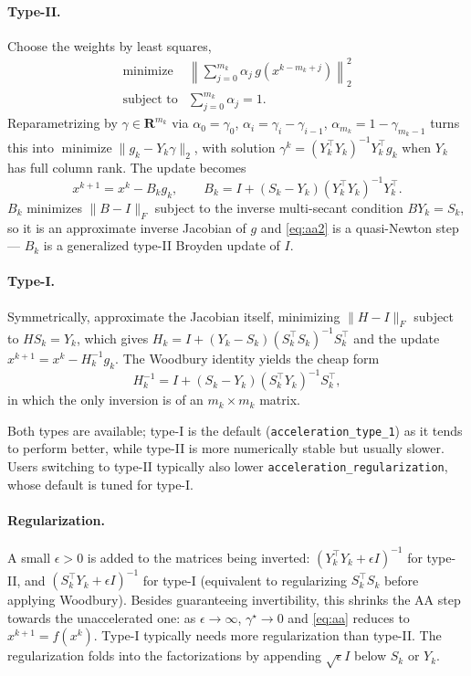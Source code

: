 \documentclass[11pt,a4paper]{article}
\newcommand{\R}{\mathbf{R}}
\newcommand{\tr}{^\top}
\DeclareMathOperator*{\minimize}{minimize}
\theoremstyle{plain}
\begin{document}
\paragraph{Type-II.} Choose the weights by least squares,
\[
\begin{array}{ll}
\minimize & \left\|\sum_{j=0}^{m_k} \alpha_j\, g(x^{k-m_k+j})\right\|_2^2\\[0.4em]
\mbox{subject to} & \sum_{j=0}^{m_k} \alpha_j = 1 .
\end{array}
\]
Reparametrizing by
$\gamma \in \R^{m_k}$ via $\alpha_0 = \gamma_0$,
$\alpha_i = \gamma_i - \gamma_{i-1}$, $\alpha_{m_k} = 1 - \gamma_{m_k-1}$ turns
this into $\minimize \|g_k - Y_k\gamma\|_2$, with solution
$\gamma^k = (Y_k\tr Y_k)^{-1}Y_k\tr g_k$ when $Y_k$ has full column rank. The
update becomes
\begin{equation}\label{eq:aa2}
x^{k+1} = x^k - B_k g_k, \qquad
B_k = I + (S_k - Y_k)(Y_k\tr Y_k)^{-1}Y_k\tr .
\end{equation}
$B_k$ minimizes $\|B - I\|_F$ subject to the inverse multi-secant condition
$BY_k = S_k$, so it is an approximate inverse Jacobian of $g$ and
\eqref{eq:aa2} is a quasi-Newton step --- $B_k$ is a generalized type-II
Broyden update of $I$.

\paragraph{Type-I.} Symmetrically, approximate the Jacobian itself, minimizing
$\|H - I\|_F$ subject to $HS_k = Y_k$, which gives
$H_k = I + (Y_k - S_k)(S_k\tr S_k)^{-1}S_k\tr$ and the update
$x^{k+1} = x^k - H_k^{-1}g_k$. The Woodbury identity yields the cheap form
\begin{equation}\label{eq:aa1}
H_k^{-1} = I + (S_k - Y_k)(S_k\tr Y_k)^{-1}S_k\tr ,
\end{equation}
in which the only inversion is of an $m_k \times m_k$ matrix.

Both types are available; type-I is the default
(\texttt{acceleration\_type\_1}) as it tends to perform better, while type-II
is more numerically stable but usually slower. Users switching to type-II
typically also lower \texttt{acceleration\_regularization}, whose default is
tuned for type-I.

\paragraph{Regularization.} A small $\epsilon > 0$ is added to the matrices
being inverted: $(Y_k\tr Y_k + \epsilon I)^{-1}$ for type-II, and
$(S_k\tr Y_k + \epsilon I)^{-1}$ for type-I (equivalent to regularizing
$S_k\tr S_k$ before applying Woodbury). Besides guaranteeing invertibility,
this shrinks the AA step towards the unaccelerated one: as
$\epsilon \to \infty$, $\gamma^\star \to 0$ and \eqref{eq:aa} reduces to
$x^{k+1} = f(x^k)$. Type-I typically needs more regularization than type-II.
The regularization folds into the factorizations by appending
$\sqrt{\epsilon}I$ below $S_k$ or $Y_k$.
\end{document}
